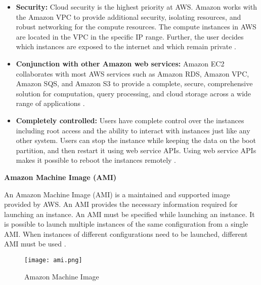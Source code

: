 \begin{itemize}
    \item \textbf{Security:} Cloud security is the highest priority at AWS. Amazon works with the Amazon VPC to provide additional security, isolating resources, and robust networking for the compute resources.
    The compute instances in AWS are located in the VPC in the specific IP range.
    Further, the user decides which instances are exposed
    to the internet and which remain private \cite{31}.
\end{itemize}

\begin{itemize}
    \item \textbf{Conjunction with other Amazon web
    services:} Amazon EC2 collaborates with most AWS
    services such as Amazon RDS, Amazon VPC, Amazon SQS, and Amazon S3 to provide a complete, secure, comprehensive solution for
    computation, query processing, and cloud storage
    across a wide range of applications \cite{31}.
\end{itemize}

\begin{itemize}
    \item \textbf{Completely controlled:} Users have
    complete control over the instances including root
    access and the ability to interact with instances just like any other system. Users can stop the instance while keeping the data on the boot partition, and then restart it using web service APIs. Using web service APIs makes it possible to reboot the instances remotely \cite{31}.
\end{itemize}

\textbf{Amazon Machine Image (AMI)}

\par An Amazon Machine Image (AMI) is a maintained and
supported image provided by AWS. An AMI provides the necessary information required for launching an instance. An AMI must be specified while launching an instance. It is possible to launch multiple instances of the same configuration from a single AMI. When instances of different configurations need to be launched, different AMI must be used \cite{32}.

\begin{figure}
    \centering
    \texttt{[image: ami.png]}
    \caption{Amazon Machine Image}{\cite{32}}
    \label{fig:ami}
\end{figure}


